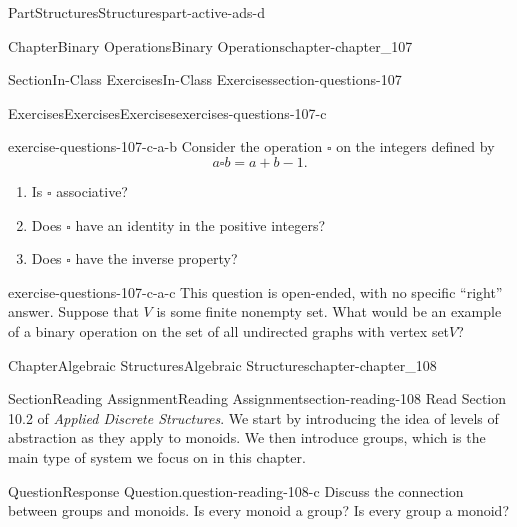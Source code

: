\documentclass[oneside,10pt,]{book}
\numberwithin{equation}{section}
\begin{document}
\begin{partptx}{Part}{Structures}{}{Structures}{}{}{part-active-ads-d}
\begin{chapterptx}{Chapter}{Binary Operations}{}{Binary Operations}{}{}{chapter-chapter_107}
\begin{sectionptx}{Section}{In-Class Exercises}{}{In-Class Exercises}{}{}{section-questions-107}
\begin{exercises-subsection-numberless}{Exercises}{Exercises}{}{Exercises}{}{}{exercises-questions-107-c}
\begin{exercisegroup}
\begin{divisionexerciseeg}{2}{}{}{exercise-questions-107-c-a-b}%
Consider the  operation \(\square\) on the  integers defined by%
\begin{equation*}
a \square b  = a+b-1.
\end{equation*}
%
\begin{enumerate}[label=(\alph*)]
\item{}Is \(\square\) associative?%
\item{}Does  \(\square\) have an identity in the positive integers?%
\item{}Does  \(\square\) have the inverse property?%
\end{enumerate}
%
\end{divisionexerciseeg}%
\begin{divisionexerciseeg}{3}{}{}{exercise-questions-107-c-a-c}%
This question is open-ended, with no specific ``right'' answer.  Suppose that \(V\) is some finite nonempty set. What would be an example of a binary operation on the set of all undirected graphs with vertex set\(V\)?%
\end{divisionexerciseeg}%
\end{exercisegroup}
\par\medskip\noindent
\end{exercises-subsection-numberless}
\end{sectionptx}
\end{chapterptx}
%
\typeout{************************************************}
\typeout{************************************************}
%
\begin{chapterptx}{Chapter}{Algebraic Structures}{}{Algebraic Structures}{}{}{chapter-chapter_108}
\renewcommand*{\chaptername}{Chapter}
\index{}%
%
%
\typeout{************************************************}
\typeout{************************************************}
%
\begin{sectionptx}{Section}{Reading Assignment}{}{Reading Assignment}{}{}{section-reading-108}
Read Section 10.2 of \emph{Applied Discrete Structures}. We start by introducing the idea of levels of abstraction as they apply to monoids.  We then introduce groups, which is the main type of system we focus on in this chapter.%
\begin{question}{Question}{Response Question.}{question-reading-108-c}%
Discuss the connection between groups and monoids. Is every monoid a group? Is every group a monoid?%
\end{question}

\end{sectionptx}
\end{chapterptx}
\end{partptx}
\end{document}
